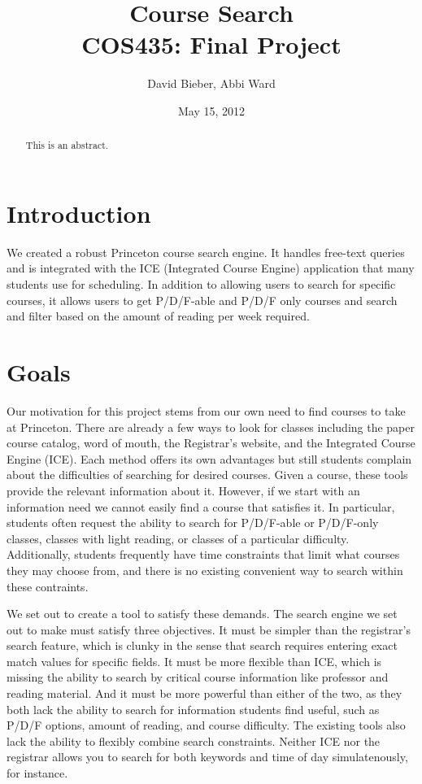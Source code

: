 \documentclass[12pt,letterpaper]{article}
\begin{document}
\title{Course Search \\ \large{COS435: Final Project}}
\author{David Bieber, Abbi Ward}
\date{May 15, 2012}

\begin{titlepage}
\maketitle
\end{titlepage}


\begin{abstract}
This is an abstract.
\end{abstract}

\section{Introduction}
We created a robust Princeton course search engine. It handles free-text queries and is integrated with the ICE (Integrated Course Engine) application that many students use for scheduling. In addition to allowing users to search for specific courses, it allows users to get P/D/F-able and P/D/F only courses and search and filter based on the amount of reading per week required. 


\section{Goals}
	Our motivation for this project stems from our own need to find courses to take at Princeton. There are already a few ways to look for classes including the paper course catalog, word of mouth, the Registrar's website, and the Integrated Course Engine (ICE). Each method offers its own advantages but still students complain about the difficulties of searching for desired courses. Given a course, these tools provide the relevant information about it. However, if we start with an information need we cannot easily find a course that satisfies it. In particular, students often request the ability to search for P/D/F-able or P/D/F-only classes, classes with light reading, or classes of a particular difficulty. Additionally, students frequently have time constraints that limit what courses they may choose from, and there is no existing convenient way to search within these contraints.
	
	We set out to create a tool to satisfy these demands. The search engine we set out to make must satisfy three objectives. It must be simpler than the registrar's search feature, which is clunky in the sense that search requires entering exact match values for specific fields. It must be more flexible than ICE, which is missing the ability to search by critical course information like professor and reading material. And it must be more powerful than either of the two, as they both lack the ability to search for information students find useful, such as P/D/F options, amount of reading, and course difficulty. The existing tools also lack the ability to flexibly combine search constraints. Neither ICE nor the registrar allows you to search for both keywords and time of day simulatenously, for instance.
	
\end{document}
